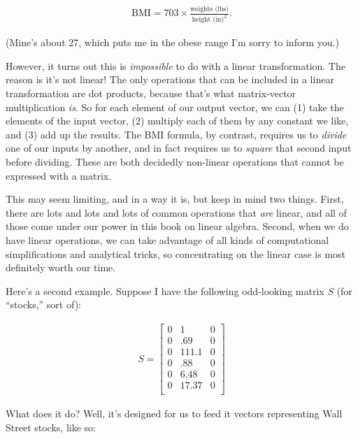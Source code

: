 \vspace{-.15in}
\begin{align*}
\textrm{BMI} = 703 \times \frac{\textrm{weights (lbs)}}{\textrm{height (in)}^2}.
\end{align*}
\vspace{-.15in}

(Mine's about 27, which puts me in the obese range I'm sorry to inform you.)

However, it turns out this is \textit{impossible} to do with a linear
transformation. The reason is it's not linear! The only operations that can be
included in a linear transformation are dot products, because that's what
matrix-vector multiplication \textit{is}. So for each element of our output
vector, we can (1) take the elements of the input vector, (2) multiply each of
them by any constant we like, and (3) add up the results. The BMI formula, by
contrast, requires us to \textit{divide} one of our inputs by another, and in
fact requires us to \textit{square} that second input before dividing. These
are both decidedly non-linear operations that cannot be expressed with a
matrix.

This may seem limiting, and in a way it is, but keep in mind two things. First,
there are lots and lots and lots of common operations that \textit{are} linear,
and all of those come under our power in this book on linear algebra. Second,
when we do have linear operations, we can take advantage of all kinds of
computational simplifications and analytical tricks, so concentrating on the
linear case is most definitely worth our time.

\bigskip

Here's a second example. Suppose I have the following odd-looking matrix $S$
(for ``stocks,'' sort of):

\vspace{-.15in}
\begin{align*}
S =
\begin{bmatrix}
0 & 1 & 0 \\
0 & .69 & 0 \\
0 & 111.1 & 0 \\
0 & .88 & 0 \\
0 & 6.48 & 0 \\
0 & 17.37 & 0 \\
\end{bmatrix}
\end{align*}
\vspace{-.15in}

What does it do? Well, it's designed for us to feed it vectors representing
Wall Street stocks, like so:

